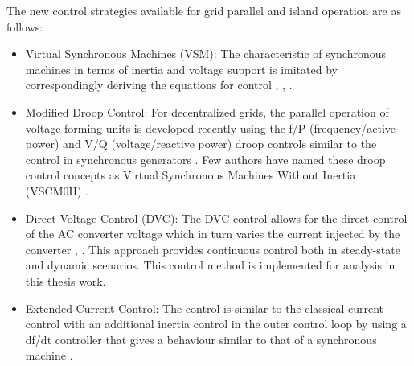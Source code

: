 The new control strategies available for grid parallel and island operation are as follows:
\begin{itemize}
    \item Virtual Synchronous Machines (VSM): The characteristic of synchronous machines in terms of inertia and voltage support is imitated by correspondingly deriving the equations for control \cite{chen_comparison_2012}, \cite{duckwitz_operating_behavior}, \cite{lu_virtual_2019}.
    
    \item Modified Droop Control:
    For decentralized grids, the parallel operation of voltage forming units is developed recently using the f/P (frequency/active power) and V/Q (voltage/reactive power) droop controls similar to the control in synchronous generators \cite{lopes2012pv}. Few authors have named these droop control concepts as Virtual Synchronous Machines Without Inertia (VSCM0H) \cite{yu2016use}.
    
    \item Direct Voltage Control (\gls{DVC}):
    The \gls{DVC} control allows for the direct control of the \gls{AC} converter voltage which in turn varies the current injected by the converter  \cite{korai_dynamic_2019}, \cite{erlich_new_2017}. This approach provides continuous control both in steady-state and dynamic scenarios. This control method is implemented for analysis in this thesis work.
    
    \item Extended Current Control:
    The control is similar to the classical current control with an additional inertia control in the outer control loop by using a df/dt controller that gives a behaviour similar to that of a synchronous machine \cite{duckwitz_derivation_2019}. 
    
\end{itemize}



